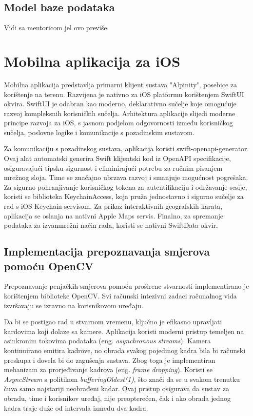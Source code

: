 \subsection{Model baze podataka}
Vidi sa mentoricom jel ovo previše.

\section{Mobilna aplikacija za iOS}

Mobilna aplikacija predstavlja primarni klijent sustava "Alpinity", posebice za korištenje na terenu. Razvijena je nativno za iOS platformu korištenjem SwiftUI okvira. SwiftUI je odabran kao moderno, deklarativno sučelje koje omogućuje razvoj kompleksnih korisničkih sučelja. Arhitektura aplikacije slijedi moderne principe razvoja za iOS, s jasnom podjelom odgovornosti između korisničkog sučelja, poslovne logike i komunikacije s pozadinskim sustavom. 

Za komunikaciju s pozadinskog sustava, aplikacija koristi swift-openapi-generator. Ovaj alat automatski generira Swift klijentski kod iz OpenAPI specifikacije, osiguravajući tipsku sigurnost i eliminirajući potrebu za ručnim pisanjem mrežnog sloja. Time se značajno ubrzava razvoj i smanjuje mogućnost pogrešaka. Za sigurno pohranjivanje korisničkog tokena za autentifikaciju i održavanje sesije, koristi se biblioteka KeychainAccess, koja pruža jednostavno i sigurno sučelje za rad s iOS Keychain servisom. Za prikaz interaktivnih geografskih karata, aplikacija se oslanja na nativni Apple Maps servis. Finalno, za spremanje podataka za izvanmrežni način rada, koristi se nativni SwiftData okvir.

\subsection{Implementacija prepoznavanja smjerova pomoću OpenCV}

Prepoznavanje penjačkih smjerova pomoću proširene stvarnosti implementirano je korištenjem biblioteke OpenCV. Svi računski intezivni zadaci računalnog vida izvršavaju se izravno na korisnikovom uređaju.

Da bi se postigao rad u stvarnom vremenu, ključno je efikasno upravljati kardovima koji dolaze sa kamere. Aplikacija koristi moderni pristup temeljen na asinkronim tokovima podataka (eng. \textit{asynchronous streams}). Kamera kontinuirano emitira kadrove, no obrada svakog pojedinog kadra bila bi računski preskupa i dovela bi do zagušenja sustava. Zbog toga je implementiran mehanizam za prorjeđivanje kadrova (eng. \textit{frame dropping}). 
Koristi se \textit{AsyncStream} s politikom \textit{bufferingOldest(1)}, što znači da se u svakom trenutku čuva samo najstariji neobrađeni kadar. Ovaj pristup osigurava da sustav za obradu, time i korisnikov uređaj, nije preopterećen, čak i ako obrada jednog kadra traje duže od intervala između dva kadra.

